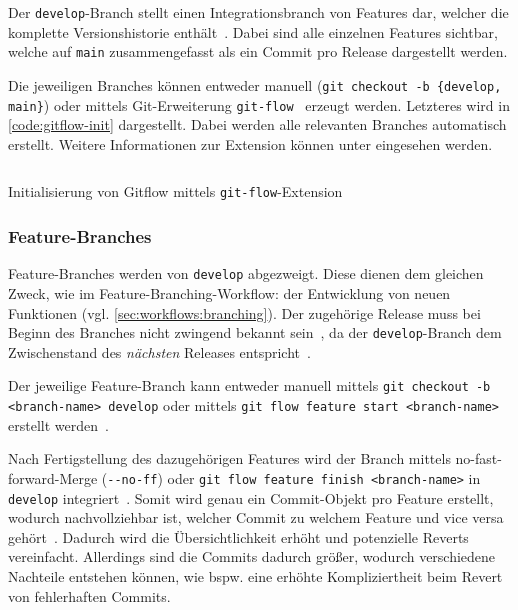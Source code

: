 Der \texttt{develop}-Branch stellt einen Integrationsbranch von Features dar, welcher die komplette Versionshistorie enthält~\cite{atlassianGitflowWorkflow}. Dabei sind alle einzelnen Features sichtbar, welche auf \texttt{main} zusammengefasst als ein Commit pro Release dargestellt werden.

Die jeweiligen Branches können entweder manuell (\texttt{git checkout -b \{develop, main\}}) oder mittels Git\hyp Erweiterung \texttt{git-flow}~\cite{driessenGitflow2012} erzeugt werden. Letzteres wird in \autoref{code:gitflow-init} dargestellt. Dabei werden alle relevanten Branches automatisch erstellt. Weitere Informationen zur Extension können unter \cite{kummerGitflowcheatsheet2023} eingesehen werden.

\begin{listing}
\inputminted[breaklines]{text}{src/assets/code/gitflow/gitflow_init.sh}
\caption{Initialisierung von Gitflow mittels \texttt{git-flow}-Extension}
\label{code:gitflow-init}
\end{listing}


\subsubsection{Feature-Branches}

Feature\hyp Branches werden von \texttt{develop} abgezweigt. Diese dienen dem gleichen Zweck, wie im Feature\hyp Branching\hyp Workflow: der Entwicklung von neuen Funktionen (vgl. \autoref{sec:workflows:branching}). Der zugehörige Release muss bei Beginn des Branches nicht zwingend bekannt sein~\cite{driessenSuccessfulGitBranching2010}, da der \texttt{develop}\hyp Branch dem Zwischenstand des \emph{nächsten} Releases entspricht~\cite{atlassianGitflowWorkflow}.

Der jeweilige Feature\hyp Branch kann entweder manuell mittels \texttt{git checkout -b <branch-name> develop} oder mittels \texttt{git flow feature start <branch-name>} erstellt werden~\cite{driessenGitflow2012}.

Nach Fertigstellung des dazugehörigen Features wird der Branch mittels no\hyp fast\hyp forward\hyp Merge (\verb|--no-ff|) oder \texttt{git flow feature finish <branch-name>} in \texttt{develop} integriert~\cite{driessenSuccessfulGitBranching2010,driessenGitflow2012}. Somit wird genau ein Commit\hyp Objekt pro Feature erstellt, wodurch nachvollziehbar ist, welcher Commit zu welchem Feature und vice versa gehört~\cite{driessenSuccessfulGitBranching2010}. Dadurch wird die Übersichtlichkeit erhöht und potenzielle Reverts vereinfacht. Allerdings sind die Commits dadurch größer, wodurch verschiedene Nachteile entstehen können, wie bspw. eine erhöhte Kompliziertheit beim Revert von fehlerhaften Commits.


